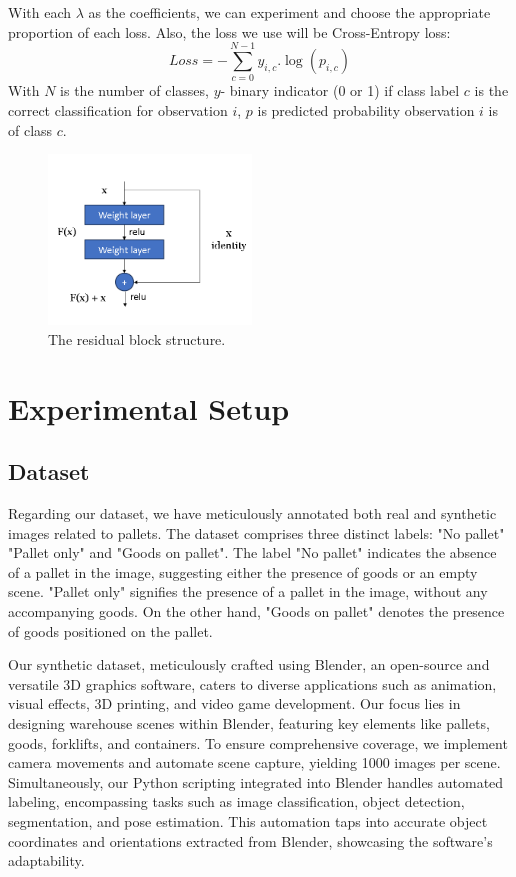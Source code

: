 \documentclass[nonacm, sigconf]{acmart}
\begin{document}
\noindent With each \(\lambda\) as the coefficients, we can experiment and choose the appropriate proportion of each loss. Also, the loss we use will be Cross-Entropy loss:
\begin{equation}
    Loss = -\sum_{c=0}^{N-1} y_{i, c}.\log(p_{i, c})
\end{equation}
With \(N\) is the number of classes, \(y\)- binary indicator (0 or 1) if class label \(c\) is the correct classification for observation  \(i\), \(p\) is predicted probability observation \(i\) is of class \(c\).

\begin{figure}[h]
  \centering
  \includegraphics[width=0.48\textwidth]{images/res_block.png}
  \caption{The residual block structure.}
  \label{fig:your-image}
\end{figure}


\section{Experimental Setup}

\subsection{Dataset}
Regarding our dataset, we have meticulously annotated both real and synthetic images related to pallets. The dataset comprises three distinct labels: "No pallet" "Pallet only" and "Goods on pallet". The label "No pallet" indicates the absence of a pallet in the image, suggesting either the presence of goods or an empty scene. "Pallet only" signifies the presence of a pallet in the image, without any accompanying goods. On the other hand, "Goods on pallet" denotes the presence of goods positioned on the pallet.

\noindent Our synthetic dataset, meticulously crafted using Blender, an open-source and versatile 3D graphics software, caters to diverse applications such as animation, visual effects, 3D printing, and video game development. Our focus lies in designing warehouse scenes within Blender, featuring key elements like pallets, goods, forklifts, and containers. To ensure comprehensive coverage, we implement camera movements and automate scene capture, yielding 1000 images per scene. Simultaneously, our Python scripting integrated into Blender handles automated labeling, encompassing tasks such as image classification, object detection, segmentation, and pose estimation. This automation taps into accurate object coordinates and orientations extracted from Blender, showcasing the software's adaptability.
\end{document}
